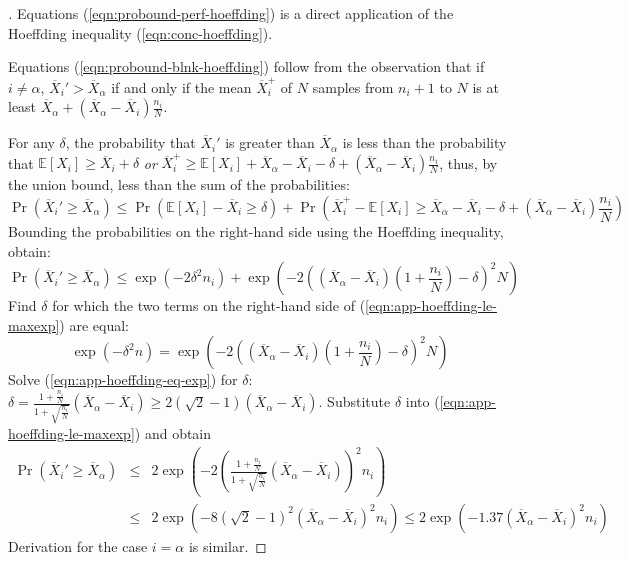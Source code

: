 \documentclass{article}
\newcommand {\IE} {\ensuremath {\mathbb{E}}}
\begin{document}
\begin{proof}[]
Equations (\ref{eqn:probound-perf-hoeffding}) is a direct
application of the Hoeffding inequality (\ref{eqn:conc-hoeffding}).

Equations (\ref{eqn:probound-blnk-hoeffding}) follow from the
observation that if $i\ne\alpha$, $\overline X_i'>\overline X_\alpha$
if and only if the mean $\overline X_i^+$ of $N$ samples from $n_i+1$
to $N$ is at least $\overline X_\alpha+(\overline X_\alpha-\overline
X_i)\frac {n_i} N$.

For any $\delta$, the probability that $\overline X_i'$ is greater
than $\overline X_\alpha$ is less than the probability that
$\IE[X_i]\ge\overline X_i+\delta$
\emph{or} $\overline X_i^+\ge \IE[X_i]+\overline X_\alpha
- \overline X_i - \delta +(\overline X_\alpha - \overline X_i)\frac {n_i} N$,
thus, by the union bound, less than the sum of the probabilities:
\begin{equation}
\Pr(\overline X_i'\ge \overline X_\alpha)\le
  \Pr(\IE[X_i]-\overline X_i \ge \delta)+
  \Pr\left(\overline X_i^+ - \IE[X_i] \ge \overline X_\alpha
           - \overline X_i - \delta +(\overline X_\alpha - \overline X_i)\frac {n_i} N\right)
\end{equation}
Bounding the probabilities on the right-hand side using the Hoeffding
inequality, obtain:
\begin{equation}
\Pr(\overline X_i'\ge \overline X_\alpha)\le 
    \exp(-2\delta^2n_i)+
         \exp\left(-2\left((\overline X_\alpha 
         - \overline X_i)\left(1+\frac {n_i} N\right)
         - \delta\right)^2N\right)
\label{eqn:app-hoeffding-le-maxexp}
\end{equation}
Find $\delta$ for which the two terms on the right-hand side of
(\ref{eqn:app-hoeffding-le-maxexp}) are equal:
\begin{equation}
\exp(-\delta^2n) = \exp(-2\left((\overline X_\alpha - \overline X_i)(1+\frac {n_i} N) - \delta\right)^2N)\label{eqn:app-hoeffding-eq-exp}
\end{equation}
Solve (\ref{eqn:app-hoeffding-eq-exp}) for $\delta$: $\delta=\frac {1+\frac {n_i} N} {1+\sqrt {\frac {n_i} N}} (\overline X_\alpha
- \overline X_i) \ge 2(\sqrt 2 - 1)(\overline X_\alpha-\overline X_i)$. Substitute $\delta$ into 
(\ref{eqn:app-hoeffding-le-maxexp}) and obtain
\begin{eqnarray}
\Pr(\overline X_i'\ge \overline X_\alpha) 
& \le & 2\exp\left(-2\left( \frac {1+\frac {n_i} N} {1+\sqrt {\frac {n_i} N}}
                          (\overline X_\alpha - \overline X_i)\right)^2 n_i\right)\nonumber \\
& \le & 2\exp(-8(\sqrt 2 - 1)^2(\overline X_\alpha - \overline X_i)^2n_i)
 \le 2\exp(-1.37(\overline X_\alpha - \overline X_i)^2n_i)
\end{eqnarray}
Derivation for the case $i=\alpha$ is similar.
\end{proof}
\end{document}
